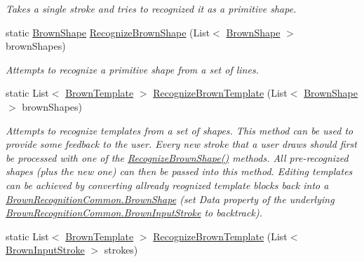 \begin{DoxyCompactItemize}
\begin{DoxyCompactList}\small\item\em \-Takes a single stroke and tries to recognized it as a primitive shape. \end{DoxyCompactList}\item 
static \hyperlink{class_brown_recognition_common_1_1_brown_shape}{\-Brown\-Shape} \hyperlink{class_brown_recognition_a_p_i_1_1_a_p_i_ab57e61c61b5f5727cc5a5c3c19059f92}{\-Recognize\-Brown\-Shape} (\-List$<$ \hyperlink{class_brown_recognition_common_1_1_brown_shape}{\-Brown\-Shape} $>$ brown\-Shapes)
\begin{DoxyCompactList}\small\item\em \-Attempts to recognize a primitive shape from a set of lines. \end{DoxyCompactList}\item 
static \-List$<$ \hyperlink{class_brown_recognition_common_1_1_brown_template}{\-Brown\-Template} $>$ \hyperlink{class_brown_recognition_a_p_i_1_1_a_p_i_a9f1a5fa344eca4e35f70fbc35fcc21ad}{\-Recognize\-Brown\-Template} (\-List$<$ \hyperlink{class_brown_recognition_common_1_1_brown_shape}{\-Brown\-Shape} $>$ brown\-Shapes)
\begin{DoxyCompactList}\small\item\em \-Attempts to recognize templates from a set of shapes. \-This method can be used to provide some feedback to the user. \-Every new stroke that a user draws should first be processed with one of the \hyperlink{class_brown_recognition_a_p_i_1_1_a_p_i_ac7688bb14d67362c0b3082279dff8d51}{\-Recognize\-Brown\-Shape()} methods. \-All pre-\/recognized shapes (plus the new one) can then be passed into this method. \-Editing templates can be achieved by converting allready reognized template blocks back into a \hyperlink{class_brown_recognition_common_1_1_brown_shape}{\-Brown\-Recognition\-Common.\-Brown\-Shape} (set \-Data property of the underlying \hyperlink{class_brown_recognition_common_1_1_brown_input_stroke}{\-Brown\-Recognition\-Common.\-Brown\-Input\-Stroke} to backtrack). \end{DoxyCompactList}\item 
static \-List$<$ \hyperlink{class_brown_recognition_common_1_1_brown_template}{\-Brown\-Template} $>$ \hyperlink{class_brown_recognition_a_p_i_1_1_a_p_i_a6005442b6ccd7f1c547f24f5ebfb138f}{\-Recognize\-Brown\-Template} (\-List$<$ \hyperlink{class_brown_recognition_common_1_1_brown_input_stroke}{\-Brown\-Input\-Stroke} $>$ strokes)

\end{DoxyCompactItemize}
